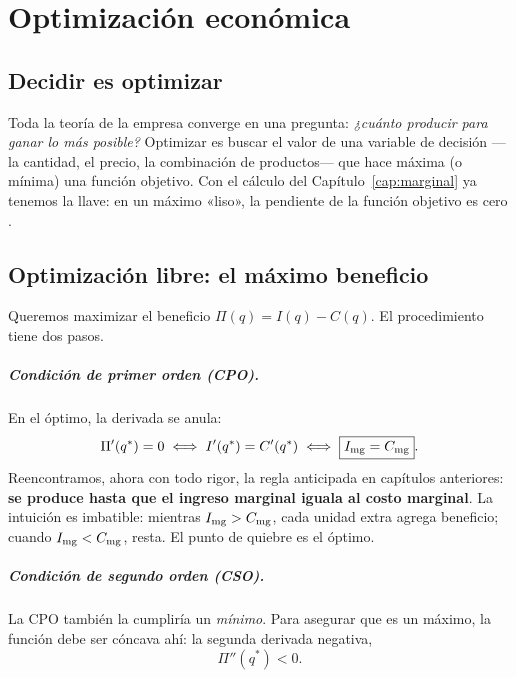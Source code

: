 \chapter{Optimización económica}
\label{cap:optimizacion}

\section{Decidir es optimizar}

Toda la teoría de la empresa converge en una pregunta: \emph{¿cuánto producir para ganar lo más posible?} Optimizar es buscar el valor de una variable de decisión —la cantidad, el precio, la combinación de productos— que hace máxima (o mínima) una función objetivo. Con el cálculo del Capítulo~\ref{cap:marginal} ya tenemos la llave: en un máximo «liso», la pendiente de la función objetivo es cero \cite{chiang}.

\section{Optimización libre: el máximo beneficio}

Queremos maximizar el beneficio $\Pi(q) = I(q) - C(q)$. El procedimiento tiene dos pasos.

\paragraph{Condición de primer orden (CPO).} En el óptimo, la derivada se anula:
\begin{equation}
\Pi'(q^{*}) = 0 \;\Longleftrightarrow\; I'(q^{*}) = C'(q^{*}) \;\Longleftrightarrow\; \boxed{I_{\mathrm{mg}} = C_{\mathrm{mg}}}.
\label{eq:cpo}
\end{equation}
Reencontramos, ahora con todo rigor, la regla anticipada en capítulos anteriores: \textbf{se produce hasta que el ingreso marginal iguala al costo marginal}. La intuición es imbatible: mientras $I_{\mathrm{mg}} > C_{\mathrm{mg}}$, cada unidad extra agrega beneficio; cuando $I_{\mathrm{mg}} < C_{\mathrm{mg}}$, resta. El punto de quiebre es el óptimo.

\paragraph{Condición de segundo orden (CSO).} La CPO también la cumpliría un \emph{mínimo}. Para asegurar que es un máximo, la función debe ser cóncava ahí: la segunda derivada negativa,
\begin{equation}
\Pi''(q^{*}) < 0.
\label{eq:cso}
\end{equation}

